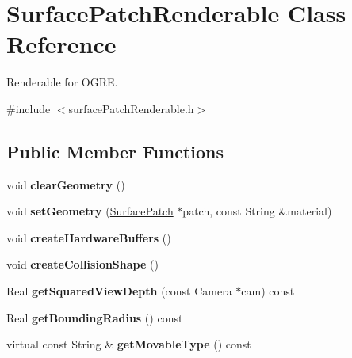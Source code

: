 \hypertarget{classSurfacePatchRenderable}{
\section{\-Surface\-Patch\-Renderable \-Class \-Reference}
\label{d3/d05/classSurfacePatchRenderable}
}


\-Renderable for \-O\-G\-R\-E.  




{\ttfamily \#include $<$surface\-Patch\-Renderable.\-h$>$}

\subsection*{\-Public \-Member \-Functions}
\begin{DoxyCompactItemize}
\item 
\hypertarget{classSurfacePatchRenderable_ab4827f17bd1401771a27a4f5cac238e3}{
void {\bfseries clear\-Geometry} ()}
\label{d3/d05/classSurfacePatchRenderable_ab4827f17bd1401771a27a4f5cac238e3}

\item 
\hypertarget{classSurfacePatchRenderable_af320fb1239ca99017bddc4912e75c985}{
void {\bfseries set\-Geometry} (\hyperlink{classSurfacePatch}{\-Surface\-Patch} $\ast$patch, const \-String \&material)}
\label{d3/d05/classSurfacePatchRenderable_af320fb1239ca99017bddc4912e75c985}

\item 
\hypertarget{classSurfacePatchRenderable_a05ef24fd50fc6ddc71f9ad989edab601}{
void {\bfseries create\-Hardware\-Buffers} ()}
\label{d3/d05/classSurfacePatchRenderable_a05ef24fd50fc6ddc71f9ad989edab601}

\item 
\hypertarget{classSurfacePatchRenderable_a30b25587c78779f381017115ee9f247a}{
void {\bfseries create\-Collision\-Shape} ()}
\label{d3/d05/classSurfacePatchRenderable_a30b25587c78779f381017115ee9f247a}

\item 
\hypertarget{classSurfacePatchRenderable_ac16714226419e50b37b55c3916aadf93}{
\-Real {\bfseries get\-Squared\-View\-Depth} (const \-Camera $\ast$cam) const }
\label{d3/d05/classSurfacePatchRenderable_ac16714226419e50b37b55c3916aadf93}

\item 
\hypertarget{classSurfacePatchRenderable_a01309ce1ea5b164f6bdc6edc77b79ee1}{
\-Real {\bfseries get\-Bounding\-Radius} () const }
\label{d3/d05/classSurfacePatchRenderable_a01309ce1ea5b164f6bdc6edc77b79ee1}

\item 
\hypertarget{classSurfacePatchRenderable_a8581ccc73ccc2c8c8501e4c0e3a61930}{
virtual const \-String \& {\bfseries get\-Movable\-Type} () const }
\label{d3/d05/classSurfacePatchRenderable_a8581ccc73ccc2c8c8501e4c0e3a61930}

\end{DoxyCompactItemize}
